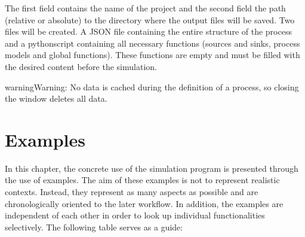 \documentclass[letterpaper,10pt,english]{sphinxmanual}
\begin{document}

\sphinxAtStartPar
The first field contains the name of the project and the second field the path (relative or absolute) to the directory
where the output files will be saved. Two files will be created. A JSON file containing the entire structure of the
process and a python\sphinxhyphen{}script containing all necessary functions (sources and sinks, process models and global functions).
These functions are empty and must be filled with the desired content before the simulation.

\begin{sphinxadmonition}{warning}{Warning:}
\sphinxAtStartPar
No data is cached during the definition of a process, so closing the window deletes all data.
\end{sphinxadmonition}


\section{Examples}
\label{\detokenize{source/Examples/examples:examples}}\label{\detokenize{source/Examples/examples:id1}}\label{\detokenize{source/Examples/examples::doc}}
\sphinxAtStartPar
In this chapter, the concrete use of the simulation program is presented through the use of examples. The aim of these
examples is not to represent realistic contexts. Instead, they represent as many aspects as possible and are
chronologically oriented to the later workflow. In addition, the examples are independent of each other in order to look
up individual functionalities selectively. The following table serves as a guide:
\end{document}

